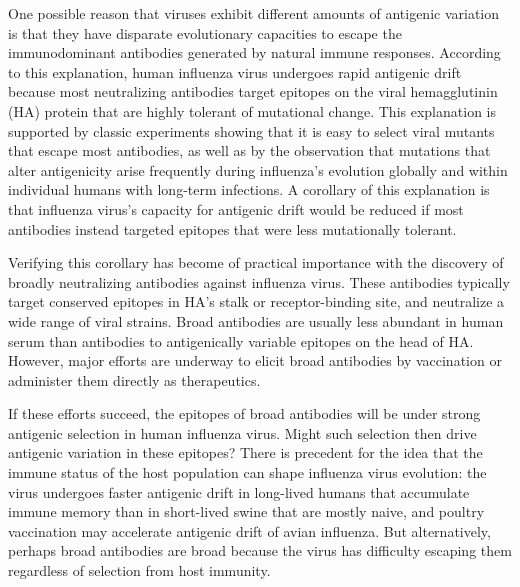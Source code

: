 \documentclass[11pt]{article}
\begin{document}
One possible reason that viruses exhibit different amounts of antigenic variation is that they have disparate evolutionary capacities to escape the immunodominant antibodies generated by natural immune responses\cite{lipsitch2007patterns,cobey2014pathogen,fulton2015mutational}.
According to this explanation, human influenza virus undergoes rapid antigenic drift because most neutralizing antibodies target epitopes on the viral hemagglutinin (HA) protein that are highly tolerant of mutational change.
This explanation is supported by classic experiments showing that it is easy to select viral mutants that escape most antibodies\cite{yewdell1979antigenic,webster1980determination}, as well as by the observation that mutations that alter antigenicity arise frequently during influenza's evolution globally\cite{koel2013substitutions,chambers2015identification,petrie2016antibodies,neher2016prediction} and within individual humans with long-term infections\cite{xue2017parallel}.
A corollary of this explanation is that influenza virus's capacity for antigenic drift would be reduced if most antibodies instead targeted epitopes that were less mutationally tolerant.

Verifying this corollary has become of practical importance with the discovery of broadly neutralizing antibodies against influenza virus.
These antibodies typically target conserved epitopes in HA's stalk\cite{sui2009structural,ekiert2009antibody,corti2011neutralizing} or receptor-binding site\cite{lee2012heterosubtypic,ekiert2012cross,schmidt2015viral}, and neutralize a wide range of viral strains.
Broad antibodies are usually less abundant in human serum than antibodies to antigenically variable epitopes on the head of HA\cite{ellebedy2014induction,andrews2015immune}.
However, major efforts are underway to elicit broad antibodies by vaccination or administer them directly as therapeutics\cite{krammer2015advances,corti2017tackling}.

If these efforts succeed, the epitopes of broad antibodies will be under strong antigenic selection in human influenza virus.
Might such selection then drive antigenic variation in these epitopes?
There is precedent for the idea that the immune status of the host population can shape influenza virus evolution: the virus undergoes faster antigenic drift in long-lived humans that accumulate immune memory than in short-lived swine that are mostly naive\cite{sheerar1989antigenic,luoh1992hemagglutinin}, and poultry vaccination may accelerate antigenic drift of avian influenza\cite{lee2004effect,cattoli2011antigenic}.
But alternatively, perhaps broad antibodies are broad because the virus has difficulty escaping them regardless of selection from host immunity.
\end{document}
